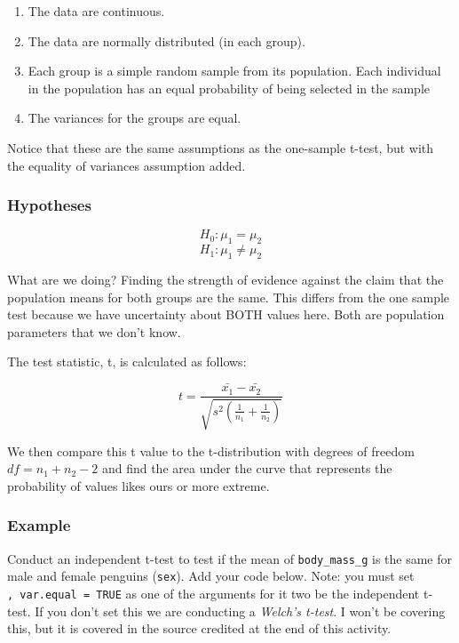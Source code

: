 \documentclass[
  openany]{book}
\providecommand{\tightlist}{%
  \setlength{\itemsep}{0pt}\setlength{\parskip}{0pt}}
\begin{document}
\begin{enumerate}
\def\labelenumi{\arabic{enumi}.}
\tightlist
\item
  The data are continuous.
\item
  The data are normally distributed (in each group).
\item
  Each group is a simple random sample from its population. Each individual in the population has an equal probability of being selected in the sample
\item
  The variances for the groups are equal.
\end{enumerate}

Notice that these are the same assumptions as the one-sample t-test, but with the equality of variances assumption added.

\hypertarget{hypotheses-1}{%
\subsubsection{Hypotheses}\label{hypotheses-1}}

\[H_0: \mu_1 = \mu_2\]
\[H_1: \mu_1 \ne \mu_2\]

What are we doing? Finding the strength of evidence against the claim that the population means for both groups are the same. This differs from the one sample test because we have uncertainty about BOTH values here. Both are population parameters that we don't know.

The test statistic, t, is calculated as follows:

\[ t = \frac{\bar{x_1} - \bar{x_2}}{\sqrt{s^2(\frac{1}{n_1} + \frac{1}{n_2})}} \]

We then compare this t value to the t-distribution with degrees of freedom \(df = n_1 + n_2 - 2\) and find the area under the curve that represents the probability of values likes ours or more extreme.

\hypertarget{example-1}{%
\subsubsection{Example}\label{example-1}}

Conduct an independent t-test to test if the mean of \texttt{body\_mass\_g} is the same for male and female penguins (\texttt{sex}). Add your code below. Note: you must set \texttt{,\ var.equal\ =\ TRUE} as one of the arguments for it two be the independent t-test. If you don't set this we are conducting a \emph{Welch's t-test}. I won't be covering this, but it is covered in the source credited at the end of this activity.
\end{document}
